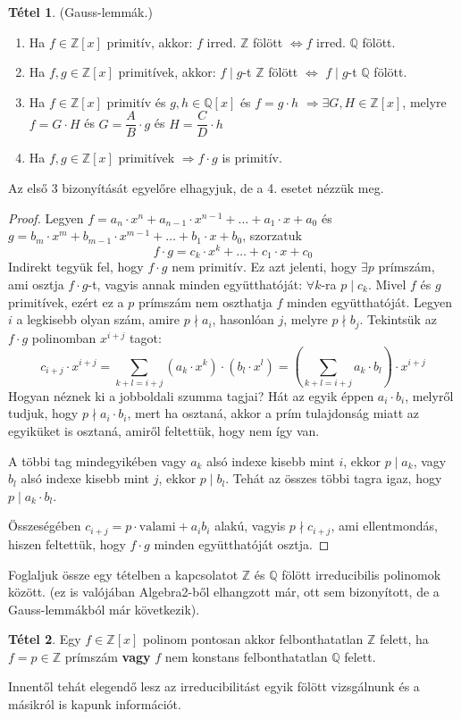 \documentclass[12pt]{book}
\theoremstyle{plain} %
\theoremstyle{definition} %
\newtheorem{theo/}{Tétel}[section]
\newenvironment{theo}
  {\renewcommand{\qedsymbol}{$\clubsuit$}%
   \pushQED{\qed}\begin{theo/}}
  {\popQED\end{theo/}}
\theoremstyle{remark}
\renewcommand\qedsymbol{$\blacksquare$}
\numberwithin{equation}{section}  %
\begin{document}
	\begin{theo}\label{gl}
		(Gauss-lemmák.)
		\begin{enumerate}
			\item Ha $f\in \mathbb{Z}[x]$ primitív, akkor: $f$ irred. $\mathbb{Z}$ fölött $\Leftrightarrow f$ irred. $\mathbb{Q}$ fölött.
			\item Ha $f,g\in \mathbb{Z}[x]$ primitívek, akkor: $f\mid g$-t $\mathbb{Z}$ fölött $\Leftrightarrow$ $f\mid g$-t $\mathbb{Q}$ fölött.
			\item Ha $f\in \mathbb{Z}[x]$ primitív és $g,h\in \mathbb{Q}[x]$ és $f=g\cdot h$ $\Rightarrow \exists G,H\in \mathbb{Z}[x]$, melyre $f=G\cdot H$ és $G=\dfrac{A}{B}\cdot g$ és $H=\dfrac{C}{D}\cdot h$
			\item Ha $f,g \in \mathbb{Z}[x]$ primitívek $\Rightarrow f\cdot g$ is primitív.
		\end{enumerate}
	\end{theo}
	Az első 3 bizonyítását egyelőre elhagyjuk, de a 4. esetet nézzük meg.
	\begin{proof}
		Legyen $f=a_n\cdot x^n + a_{n-1}\cdot x^{n-1} + \ldots + a_1\cdot x + a_0$ és $g=b_m\cdot x^m + b_{m-1}\cdot x^{m-1} + \ldots + b_1\cdot x + b_0$, szorzatuk
		\[ f\cdot g = c_k\cdot x^k + \ldots + c_1 \cdot x + c_0  \]
		Indirekt tegyük fel, hogy $f\cdot g$ nem primitív. Ez azt jelenti, hogy $\exists p$ prímszám, ami osztja $f\cdot g$-t, vagyis annak minden együtthatóját: $\forall k$-ra $p \mid c_k$. Mivel $f$ és $g$ primitívek, ezért ez a $p$ prímszám nem oszthatja $f$ minden együtthatóját. Legyen $i$ a legkisebb olyan szám, amire $p \nmid a_i$, hasonlóan $j$, melyre $p \nmid b_j$.
		Tekintsük az $f\cdot g$ polinomban $x^{i+j}$ tagot:
		\[ c_{i+j} \cdot x^{i+j}= \displaystyle\sum_{k+l=i+j} {(a_k\cdot x^k)\cdot (b_l\cdot x^l)} = \left( \displaystyle\sum_{k+l=i+j} a_k \cdot b_l \right) \cdot x^{i+j} \]
		Hogyan néznek ki a jobboldali szumma tagjai? Hát az egyik éppen $a_i\cdot b_i$, melyről tudjuk, hogy $p \nmid a_i\cdot b_i$, mert ha osztaná, akkor a prím tulajdonság miatt az egyiküket is osztaná, amiről feltettük, hogy nem így van.
		
		A többi tag mindegyikében vagy $a_k$ alsó indexe kisebb mint $i$, ekkor $p\mid a_k$, vagy $b_l$ alsó indexe kisebb mint $j$, ekkor $p\mid b_l$. Tehát az összes többi tagra igaz, hogy $p\mid a_k\cdot b_l$.
		
		Összeségében $c_{i+j} = p\cdot \text{valami} + a_i b_i$ alakú, vagyis $p \nmid c_{i+j}$, ami ellentmondás, hiszen feltettük, hogy $f\cdot g$ minden együtthatóját osztja.
	\end{proof}
	Foglaljuk össze egy tételben a kapcsolatot $\mathbb{Z}$ és $\mathbb{Q}$ fölött irreducibilis polinomok között. (ez is valójában Algebra2-ből elhangzott már, ott sem bizonyított, de a Gauss-lemmákból már következik).
	\begin{theo}
		Egy $f\in \mathbb{Z}[x]$ polinom pontosan akkor felbonthatatlan $\mathbb{Z}$ felett, ha $f=p\in \mathbb{Z}$ prímszám \textbf{vagy} $f$ nem konstans felbonthatatlan $\mathbb{Q}$ felett.
	\end{theo}
	Innentől tehát elegendő lesz az irreducibilitást egyik fölött vizsgálnunk és a másikról is kapunk információt.
	
\end{document}

